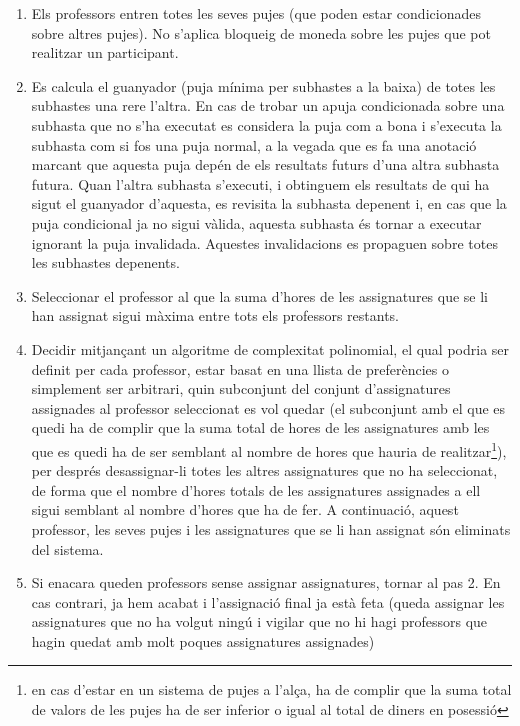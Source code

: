 \documentclass[10pt,twocolumn]{article}
\begin{document}
\begin{enumerate}
	\item Els professors entren totes les seves pujes (que poden estar condicionades sobre altres pujes). No s'aplica bloqueig de moneda sobre les pujes que pot realitzar un participant.
	\item Es calcula el guanyador (puja mínima per subhastes a la baixa) de totes les subhastes una rere l'altra. En cas de trobar un apuja condicionada sobre una subhasta que no s'ha executat es considera la puja com a bona i s'executa la subhasta com si fos una puja normal, a la vegada que es fa una anotació marcant que aquesta puja depén de els resultats futurs d'una altra subhasta futura. Quan l'altra subhasta s'executi, i obtinguem els resultats de qui ha sigut el guanyador d'aquesta, es revisita la subhasta depenent i, en cas que la puja condicional ja no sigui vàlida, aquesta subhasta és tornar a executar ignorant la puja invalidada. Aquestes invalidacions es propaguen sobre totes les subhastes depenents.
	\item Seleccionar el professor al que la suma d'hores de les assignatures que se li han assignat sigui màxima entre tots els professors restants.
	\item Decidir mitjançant un algoritme de complexitat polinomial, el qual podria ser definit per cada professor, estar basat en una llista de preferències o simplement ser arbitrari, quin subconjunt del conjunt d'assignatures assignades al professor seleccionat es vol quedar (el subconjunt amb el que es quedi ha de complir que la suma total de hores de les assignatures amb les que es quedi ha de ser semblant al nombre de hores que hauria de realitzar\footnote{en cas d'estar en un sistema de pujes a l'alça, ha de complir que la suma total de valors de les pujes ha de ser inferior o igual al total de diners en posessió}), per després desassignar-li totes les altres assignatures que no ha seleccionat, de forma que el nombre d'hores totals de les assignatures assignades a ell sigui semblant al nombre d'hores que ha de fer. A continuació, aquest professor, les seves pujes i les assignatures que se li han assignat són eliminats del sistema.
	\item Si enacara queden professors sense assignar assignatures, tornar al pas 2. En cas contrari, ja hem acabat i l'assignació final ja està feta (queda assignar les assignatures que no ha volgut ningú i vigilar que no hi hagi professors que hagin quedat amb molt poques assignatures assignades)
\end{enumerate}
\end{document}
